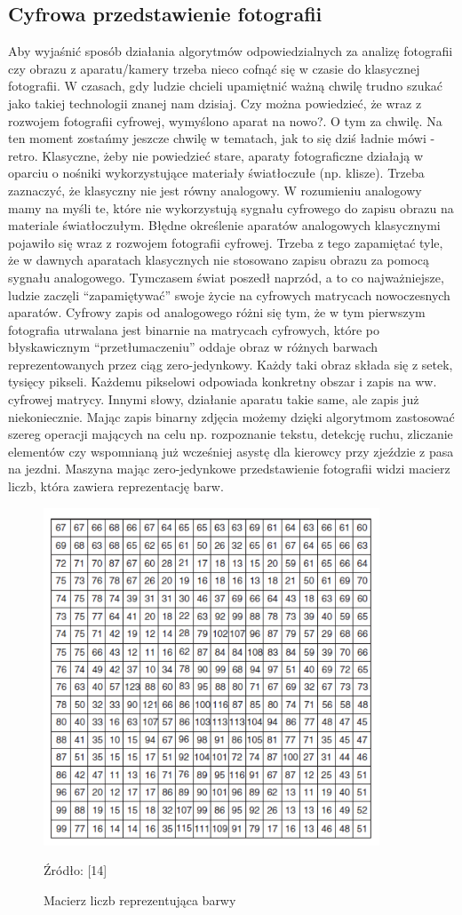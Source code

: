 \documentclass{article}
\begin{document}
	\subsection{Cyfrowa przedstawienie fotografii}
	Aby wyjaśnić sposób działania algorytmów odpowiedzialnych za analizę fotografii czy obrazu z aparatu/kamery trzeba nieco cofnąć się w czasie do klasycznej fotografii.
	W czasach, gdy ludzie chcieli upamiętnić ważną chwilę trudno szukać jako takiej technologii znanej nam dzisiaj. Czy można powiedzieć, że wraz z rozwojem fotografii cyfrowej, wymyślono aparat na nowo?. O tym za chwilę. Na ten moment zostańmy jeszcze chwilę w tematach, jak to się dziś ładnie mówi - retro. Klasyczne, żeby nie powiedzieć stare, aparaty fotograficzne działają w oparciu o nośniki wykorzystujące materiały światłoczułe (np. klisze). Trzeba zaznaczyć, że klasyczny nie jest równy analogowy. W rozumieniu analogowy mamy na myśli te, które nie wykorzystują sygnału cyfrowego do zapisu obrazu na materiale światłoczułym. Błędne określenie aparatów analogowych klasycznymi pojawiło się wraz z rozwojem fotografii cyfrowej. Trzeba z tego zapamiętać tyle, że w dawnych aparatach klasycznych nie stosowano zapisu obrazu za pomocą sygnału analogowego. Tymczasem świat poszedł naprzód, a to co najważniejsze, ludzie zaczęli “zapamiętywać” swoje życie na cyfrowych matrycach nowoczesnych aparatów. Cyfrowy zapis od analogowego różni się tym, że w tym pierwszym fotografia utrwalana jest binarnie na matrycach cyfrowych, które po błyskawicznym “przetłumaczeniu” oddaje obraz w różnych barwach reprezentowanych przez ciąg zero-jedynkowy. Każdy taki obraz składa się z setek, tysięcy pikseli. Każdemu pikselowi odpowiada konkretny obszar i zapis na ww. cyfrowej matrycy. Innymi słowy, działanie aparatu takie same, ale zapis już niekoniecznie. Mając zapis binarny zdjęcia możemy dzięki algorytmom zastosować szereg operacji mających na celu np. rozpoznanie tekstu, detekcję ruchu, zliczanie elementów czy wspomnianą już wcześniej asystę dla kierowcy przy zjeździe z pasa na jezdni. Maszyna mając zero-jedynkowe przedstawienie fotografii widzi macierz liczb, która zawiera reprezentację barw.
	\begin{figure}
		\centering
		\includegraphics[width=10cm]{macierz}
		\caption{Macierz liczb reprezentująca barwy}
		Źródło: [14]
	\end{figure}
\end{document}
